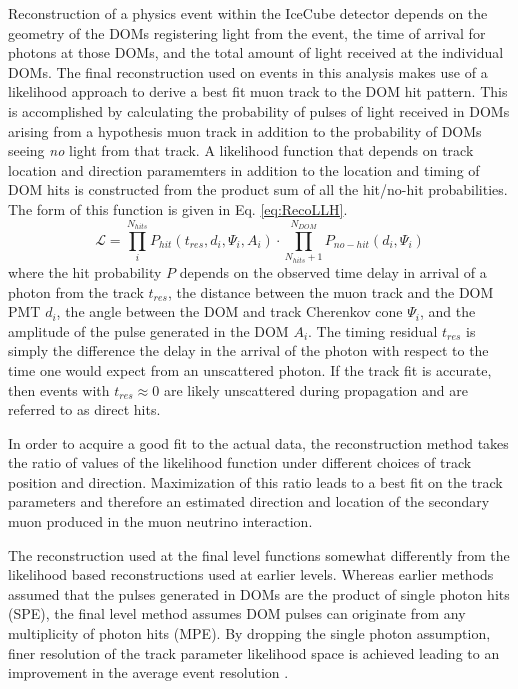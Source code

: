 \documentclass{gatech-thesis}
\begin{document}
Reconstruction of a physics event within the IceCube detector depends on the geometry of the DOMs registering light from the event, the time of arrival for photons at those DOMs, and the total amount of light received at the individual DOMs. The final reconstruction used on events in this analysis makes use of a likelihood approach to derive a best fit muon track to the DOM hit pattern. This is accomplished by calculating the probability of pulses of light received in DOMs arising from a hypothesis muon track in addition to the probability of DOMs seeing \textit{no} light from that track. A likelihood function that depends on track location and direction paramemters in addition to the location and timing of DOM hits is constructed from the product sum of all the hit/no-hit probabilities. The form of this function is given in Eq. \ref{eq:RecoLLH}.
\begin{equation}
\label{eq:RecoLLH}
\mathcal{L} = \prod_{i}^{N_{hits}} P_{hit}(t_{res},d_i,\Psi_i,A_i) \cdot \prod_{N_{hits}+1}^{N_{DOM}} P_{no-hit}(d_i,\Psi_i)
\end{equation}
where the hit probability $P$ depends on the observed time delay in arrival of a photon from the track $t_{res}$, the distance between the muon track and the DOM PMT $d_i$, the angle between the DOM and track Cherenkov cone $\Psi_i$, and the amplitude of the pulse generated in the DOM $A_i$. The timing residual $t_{res}$ is simply the difference the delay in the arrival of the photon with respect to the time one would expect from an unscattered photon. If the track fit is accurate, then events with $t_{res} \approx 0$ are likely unscattered during propagation and are referred to as direct hits.

In order to acquire a good fit to the actual data, the reconstruction method takes the ratio of values of the likelihood function under different choices of track position and direction. Maximization of this ratio leads to a best fit on the track parameters and therefore an estimated direction and location of the secondary muon produced in the muon neutrino interaction.

The reconstruction used at the final level functions somewhat differently from the likelihood based reconstructions used at earlier levels. Whereas earlier methods assumed that the pulses generated in DOMs are the product of single photon hits (SPE), the final level method assumes DOM pulses can originate from any multiplicity of photon hits (MPE). By dropping the single photon assumption, finer resolution of the track parameter likelihood space is achieved leading to an improvement in the average event resolution \cite{2004NIMPA.524..169A}.
\end{document}
